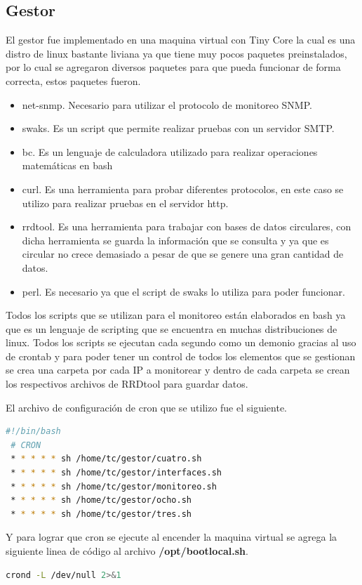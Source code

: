 \documentclass[12pt, titlepage]{article}
\begin{document}
\subsection{Gestor}
El gestor fue implementado en una maquina virtual con Tiny Core la cual es una distro de linux bastante liviana ya que tiene muy pocos paquetes preinstalados, por lo cual se agregaron diversos paquetes para que pueda funcionar de forma correcta, estos paquetes fueron.
\begin{itemize}
 \item net-snmp. Necesario para utilizar el protocolo de monitoreo SNMP.
 \item swaks. Es un script que permite realizar pruebas con un servidor SMTP.
 \item bc. Es un lenguaje de calculadora utilizado para realizar operaciones matemáticas en bash
 \item curl. Es una herramienta para probar diferentes protocolos, en este caso se utilizo para realizar pruebas en el servidor http.
 \item rrdtool. Es una herramienta para trabajar con bases de datos circulares, con dicha herramienta se guarda la información que se consulta y ya que es circular no crece demasiado a pesar de que se genere una gran cantidad de datos.
 \item perl. Es necesario ya que el script de swaks lo utiliza para poder funcionar. 
\end{itemize}

Todos los scripts que se utilizan para el monitoreo están elaborados en bash ya que es un lenguaje de scripting que se encuentra en muchas distribuciones de linux. Todos los scripts se ejecutan cada segundo como un demonio gracias al uso de crontab y para poder tener un control de todos los elementos que se gestionan se crea una carpeta por cada IP a monitorear y dentro de cada carpeta se crean los respectivos archivos de RRDtool para guardar datos.

El archivo de configuración de cron que se utilizo fue el siguiente.
\begin{lstlisting}[language=bash]
 #!/bin/bash
 # CRON
 * * * * * sh /home/tc/gestor/cuatro.sh
 * * * * * sh /home/tc/gestor/interfaces.sh
 * * * * * sh /home/tc/gestor/monitoreo.sh
 * * * * * sh /home/tc/gestor/ocho.sh
 * * * * * sh /home/tc/gestor/tres.sh
\end{lstlisting}

Y para lograr que cron se ejecute al encender la maquina virtual se agrega la siguiente linea de código al archivo \textbf{/opt/bootlocal.sh}.
\begin{lstlisting}[language=bash]
 crond -L /dev/null 2>&1
\end{lstlisting}
\end{document}
